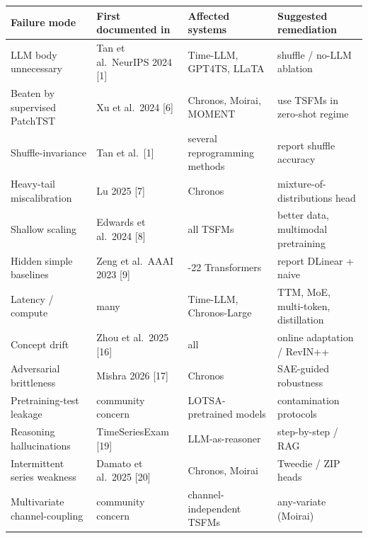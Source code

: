 {\def\LTcaptype{none} %
\begin{longtable}[]{@{}
  >{\raggedright\arraybackslash}p{}
  >{\raggedright\arraybackslash}p{}
  >{\raggedright\arraybackslash}p{}
  >{\raggedright\arraybackslash}p{}@{}}
\toprule\noalign{}
\begin{minipage}[b]{\linewidth}\raggedright
Failure mode
\end{minipage} & \begin{minipage}[b]{\linewidth}\raggedright
First documented in
\end{minipage} & \begin{minipage}[b]{\linewidth}\raggedright
Affected systems
\end{minipage} & \begin{minipage}[b]{\linewidth}\raggedright
Suggested remediation
\end{minipage} \\
\midrule\noalign{}
\endhead
\bottomrule\noalign{}
\endlastfoot
LLM body unnecessary & Tan et al.~NeurIPS 2024 {[}1{]} & Time-LLM, GPT4TS, LLaTA & shuffle / no-LLM ablation \\
Beaten by supervised PatchTST & Xu et al.~2024 {[}6{]} & Chronos, Moirai, MOMENT & use TSFMs in zero-shot regime \\
Shuffle-invariance & Tan et al.~{[}1{]} & several reprogramming methods & report shuffle accuracy \\
Heavy-tail miscalibration & Lu 2025 {[}7{]} & Chronos & mixture-of-distributions head \\
Shallow scaling & Edwards et al.~2024 {[}8{]} & all TSFMs & better data, multimodal pretraining \\
Hidden simple baselines & Zeng et al.~AAAI 2023 {[}9{]} & 2021-22 Transformers & report DLinear + naive \\
Latency / compute & many & Time-LLM, Chronos-Large & TTM, MoE, multi-token, distillation \\
Concept drift & Zhou et al.~2025 {[}16{]} & all & online adaptation / RevIN++ \\
Adversarial brittleness & Mishra 2026 {[}17{]} & Chronos & SAE-guided robustness \\
Pretraining-test leakage & community concern & LOTSA-pretrained models & contamination protocols \\
Reasoning hallucinations & TimeSeriesExam {[}19{]} & LLM-as-reasoner & step-by-step / RAG \\
Intermittent series weakness & Damato et al.~2025 {[}20{]} & Chronos, Moirai & Tweedie / ZIP heads \\
Multivariate channel-coupling & community concern & channel-independent TSFMs & any-variate (Moirai) \\
\end{longtable}
}

